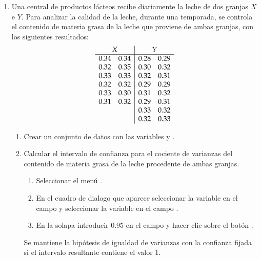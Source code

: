 \begin{enumerate}[leftmargin=*]
\item  Una central de productos lácteos recibe diariamente la leche de dos granjas $X$ e $Y$. Para analizar la calidad de
la leche, durante una temporada, se controla el contenido de materia grasa de la leche que proviene de ambas granjas, con
los siguientes resultados:
\[
\begin{array}{ll|ll}
\multicolumn{2}{c|}{X} & \multicolumn{2}{c}{Y} \\
\hline
0.34 & 0.34 & 0.28 & 0.29 \\
0.32 & 0.35 & 0.30 & 0.32 \\
0.33 & 0.33 & 0.32 & 0.31 \\
0.32 & 0.32 & 0.29 & 0.29 \\
0.33 & 0.30 & 0.31 & 0.32 \\
0.31 & 0.32 & 0.29 & 0.31 \\
 &  & 0.33 & 0.32 \\
 &  & 0.32 & 0.33 \\
\end{array}
\]

\begin{enumerate}
\item Crear un conjunto de datos con las variables  y .

\item Calcular el intervalo de confianza para el cociente de varianzas del contenido de materia grasa de la leche procedente de ambas
granjas. 
\begin{indicacion}{
\begin{enumerate}
\item Seleccionar el menú .
\item En el cuadro de dialogo que aparece seleccionar la variable  en el campo  y
seleccionar la variable  en el campo .
\item En la solapa  introducir $0.95$ en el campo  y hacer clic sobre el botón .
\end{enumerate}
Se mantiene la hipótesis de igualdad de varianzas con la confianza fijada si el intervalo resultante contiene el valor 1. 
}
\end{indicacion}


\end{enumerate}
\end{enumerate}

